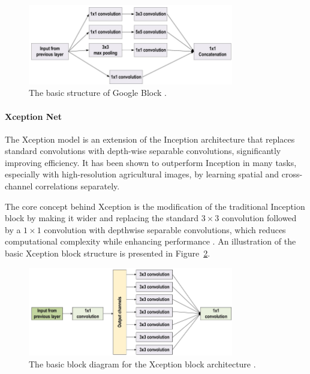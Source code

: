 \begin{figure}[H] %
    \centering
    \includegraphics[width=0.8\textwidth]{chapters/chapter1/images/Figure09.png}
    \caption{The basic structure of Google Block \parencite{alzubaidi2021review}.}
    \label{fig:figure09}
\end{figure}

\paragraph{Xception Net}

The Xception model is an extension of the Inception architecture that replaces standard convolutions with depth-wise separable convolutions, significantly improving efficiency. It has been shown to outperform Inception in many tasks, especially with high-resolution agricultural images, by learning spatial and cross-channel correlations separately.

The core concept behind Xception is the modification of the traditional Inception block by making it wider and replacing the standard $3 \times 3$ convolution followed by a $1 \times 1$ convolution with depthwise separable convolutions, which reduces computational complexity while enhancing performance \parencite{alzubaidi2021review}. An illustration of the basic Xception block structure is presented in Figure~\ref{fig:figure10}.


\begin{figure}[H] %
    \centering
    \includegraphics[width=0.8\textwidth]{chapters/chapter1/images/Figure10.png}
    \caption{The basic block diagram for the Xception block architecture \parencite{alzubaidi2021review}.}
    \label{fig:figure10}
\end{figure}

